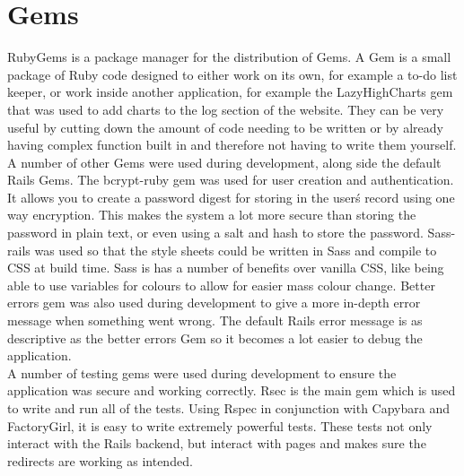 \section{Gems}
RubyGems \citep{rubygems:2009} is a package manager for the distribution of Gems. A Gem is a small package of Ruby code designed to either work on its own, for example a to-do list keeper, or work inside another application, for example the LazyHighCharts gem that was used to add charts to the log section of the website. They can be very useful by cutting down the amount of code needing to be written or by already having complex function built in and therefore not having to write them yourself. A number of other Gems were used during development, along side the default Rails Gems. The bcrypt-ruby gem was used for user creation and authentication. It allows you to create a password digest for storing in the user\'s record using one way encryption. This makes the system a lot more secure than storing the password in plain text, or even using a salt and hash to store the password. Sass-rails was used so that the style sheets could be written in Sass and compile to CSS at build time. Sass is has a number of benefits over vanilla CSS, like being able to use variables for colours to allow for easier mass colour change. Better errors gem was also used during development to give a more in-depth error message when something went wrong. The default Rails error message is as descriptive as the better errors Gem so it becomes a lot easier to debug the application.\\
A number of testing gems were used during development to ensure the application was secure and working correctly. Rsec is the main gem which is used to write and run all of the tests. Using Rspec in conjunction with Capybara and FactoryGirl, it is easy to write extremely powerful tests. These tests not only interact with the Rails backend, but interact with pages and makes sure the redirects are working as intended.